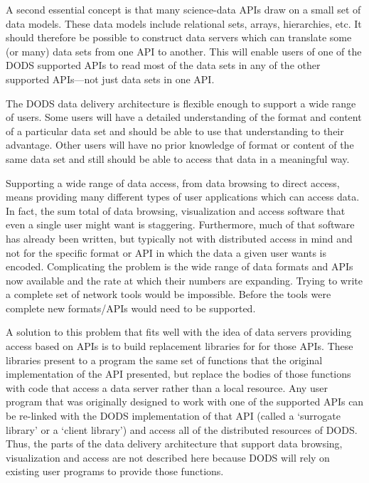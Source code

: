 A second essential concept is that many science-data APIs draw on a small set
of data models. These data models include relational sets, arrays,
hierarchies, etc. It should therefore be possible to construct data servers
which can translate some (or many) data sets from one API to another. This
will enable users of one of the DODS supported APIs to read most of the data
sets in any of the other supported APIs---not just data sets in one API\@.

The DODS data delivery architecture is flexible enough to support a wide
range of users. Some users will have a detailed understanding of the format
and content of a particular data set and should be able to use that
understanding to their advantage. Other users will have no prior knowledge of
format or content of the same data set and still should be able to access
that data in a meaningful way.

Supporting a wide range of data access, from data browsing to direct
access, means providing many different types of user applications which can
access data. In fact, the sum total of data browsing, visualization and
access software that even a single user might want is staggering.
Furthermore, much of that software has already been written, but typically
not with distributed access in mind and not for the specific format or API in
which the data a given user wants is encoded. Complicating the problem is the
wide range of data formats and APIs now available and the rate at which their
numbers are expanding. Trying to write a complete set of network tools would
be impossible. Before the tools were complete new formats/APIs
would need to be supported.

A solution to this problem that fits well with the idea of data servers
providing access based on APIs is to build replacement libraries for for
those APIs. These libraries present to a program the same set of functions
that the original implementation of the API presented, but replace the bodies
of those functions with code that access a data server rather than a local
resource. Any user program that was originally designed to work with one of
the supported APIs can be re-linked with the DODS implementation of that API
(called a `surrogate library' or a `client library') and access all of the
distributed resources of DODS\@. Thus, the parts of the data delivery
architecture that support data browsing, visualization and access are not
described here because DODS will rely on existing user programs to provide
those functions.

